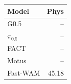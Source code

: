 \begin{tabular}{lr}
\hline
Model & Phys \\
\hline
G0.5 & -- \\
$\pi_{0.5}$ & -- \\
FACT & -- \\
Motus & -- \\
Fast-WAM & 45.18 \\
\hline
\end{tabular}
